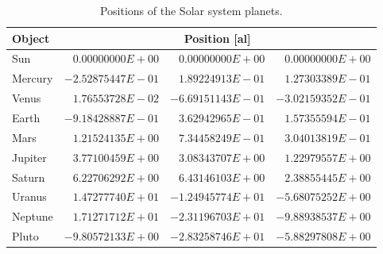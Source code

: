 \documentclass[a4paper,12pt,openany]{book}
\theoremstyle{break}
\begin{document}
\begin{table} [H]
\begin{center}
\caption{Positions of the Solar system planets.}\label{tbl:solarsystempos}
\begin{tabular}{ l r r r }
\toprule[1.5pt]
\bf Object & \multicolumn{3}{c}{\bf Position [al]} \\
\midrule
Sun & $0.00000000E+00$  &  $0.00000000E+00$  &  $0.00000000E+00$ \\
Mercury & $-2.52875447E-01$  &  $1.89224913E-01$  &  $1.27303389E-01$ \\
Venus & $1.76553728E-02$  &  $-6.69151143E-01$  &  $-3.02159352E-01$ \\
Earth & $-9.18428887E-01$  &  $3.62942965E-01$  &  $1.57355594E-01$ \\
Mars & $1.21524135E+00$  &  $7.34458249E-01$  &  $3.04013819E-01$ \\
Jupiter & $3.77100459E+00$  &  $3.08343707E+00$  &  $1.22979557E+00$ \\
Saturn & $6.22706292E+00$  &  $6.43146103E+00$  &  $2.38855445E+00$ \\
Uranus & $1.47277740E+01$  &  $-1.24945774E+01$  &  $-5.68075252E+00$ \\
Neptune & $1.71271712E+01$  &  $-2.31196703E+01$  &  $-9.88938537E+00$ \\
Pluto & $-9.80572133E+00$  &  $-2.83258746E+01$  &  $-5.88297808E+00$ \\
\bottomrule[1.25pt]
\end{tabular}
\end{center}
\end{table}
\end{document}
